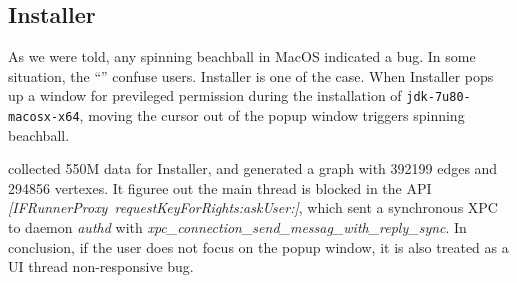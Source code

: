 \subsection{Installer}

As we were told, any spinning beachball in MacOS indicated a bug. In some
situation, the ``'' confuse users. Installer is one of the case. When
Installer pops up a window for previleged permission during the installation of
\texttt{jdk-7u80-macosx-x64}, moving the cursor out of the popup window triggers
spinning beachball.

\xxx collected 550M data for Installer, and generated a graph with
392199 edges and 294856 vertexes. It figuree out the main thread is
blocked in the API \textit{[IFRunnerProxy\ requestKeyForRights:askUser:]},
which sent a synchronous XPC to daemon \textit{authd} with
\textit{xpc\_connection\_send\_messag\_with\_reply\_sync}.
In conclusion, if the
user does not focus on the popup window, it is also treated as a UI thread
non-responsive bug.